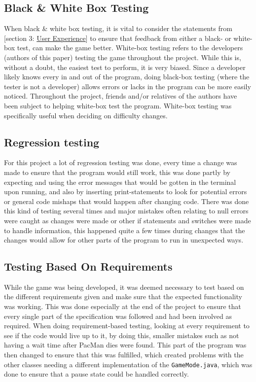 \documentclass[a4paper,5pt]{article}
\begin{document}
\subsection{Black \& White Box Testing}
When black \& white box testing, it is vital to consider the statements from [section 3: \hyperref[userexp]{User Experience}] to ensure that feedback from either a black- or white-box test, can make the game better. White-box testing refers to the developers (authors of this paper) testing the game throughout the project. While this is, without a doubt, the easiest test to perform, it is very biased. Since a developer likely knows every in and out of the program, doing black-box testing (where the tester is not a developer) allows errors or lacks in the program can be more easily noticed. Throughout the project, friends and/or relatives of the authors have been subject to helping white-box test the program. White-box testing was specifically useful when deciding on difficulty changes.

\subsection{Regression testing}
For this project a lot of regression testing was done, every time a change was made to ensure that the program would still work, this was done partly by expecting and using the error messages that would be gotten in the terminal upon running, and also by inserting print-statements to look for potential errors or general code mishaps that would happen after changing code. There was done this kind of testing several times and major mistakes often relating to null errors were caught as changes were made or other if statements and switches were made to handle information, this happened quite a few times during changes that the changes would allow for other parts of the program to run in unexpected ways.

\subsection{Testing Based On Requirements}
While the game was being developed, it was deemed necessary to test based on the different requirements given and make sure that the expected functionality was working. This was done especially at the end of the project to ensure that every single part of the specification was followed and had been involved as required. When doing requirement-based testing, looking at every requirement to see if the code would live up to it, by doing this, smaller mistakes such as not having a wait time after PacMan dies were found. This part of the program was then changed to ensure that this was fulfilled, which created problems with the other classes needing a different implementation of the \texttt{GameMode.java}, which was done to ensure that a pause state could be handled correctly.
\end{document}
